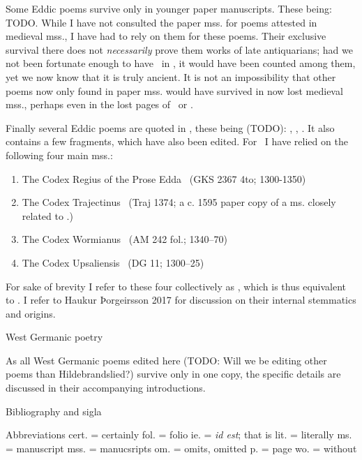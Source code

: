     Some Eddic poems survive only in younger paper manuscripts. These being: TODO. While I have not consulted the paper mss. for poems attested in medieval mss., I have had to rely on them for these poems. Their exclusive survival there does not \emph{necessarily} prove them works of late antiquarians; had we not been fortunate enough to have \Baldrsdraumar\ in \AM, it would have been counted among them, yet we now know that it is truly ancient. It is not an impossibility that other poems now only found in paper mss. would have survived in now lost medieval mss., perhaps even in the lost pages of \Regius\ or \AM.

    Finally several Eddic poems are quoted in \Gylfaginning, these being (TODO): \Voluspa, \Vafthrudnismal, \Grimnismal. It also contains a few fragments, which have also been edited. For \Gylfaginning\ I have relied on the following four main mss.:\begin{enumerate}
	   \item The Codex Regius of the Prose Edda \RegiusProse\ (GKS 2367 4to; 1300-1350)
     \item The Codex Trajectinus \Trajectinus\ (Traj 1374; a c. 1595 paper copy of a ms. closely related to \RegiusProse.)
     \item The Codex Wormianus \Wormianus\ (AM 242 fol.; 1340–70)
     \item The Codex Upsaliensis \Upsaliensis\ (DG 11; 1300–25)\end{enumerate}

     For sake of brevity I refer to these four collectively as \GylfMS, which is thus equivalent to \RegiusProse\Trajectinus\Wormianus\Upsaliensis. I refer to Haukur Þorgeirsson 2017 for discussion on their internal stemmatics and origins.

     West Germanic poetry
     
     As all West Germanic poems edited here (TODO: Will we be editing other poems than Hildebrandslied?) survive only in one copy, the specific details are discussed in their accompanying introductions.

Bibliography and sigla

Abbreviations
  cert. = certainly
  fol. = folio
  ie. = \emph{id est}; that is
  lit. = literally
  ms. = manuscript
  mss. = manucsripts
  om. = omits, omitted
  p. = page
  wo. = without
